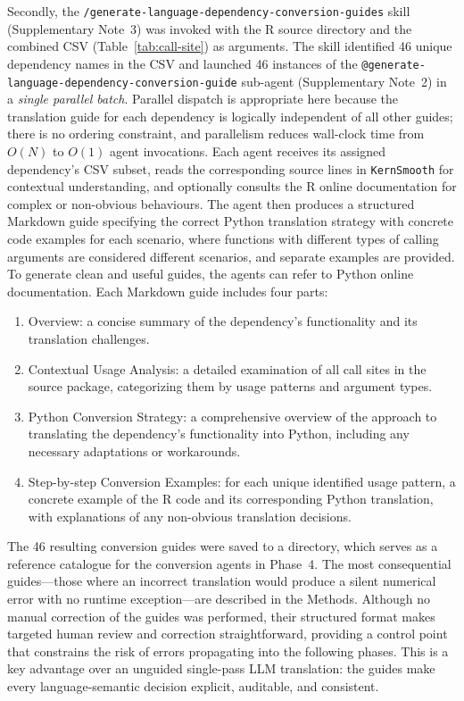 \documentclass[12pt,a4paper]{article}
\makeatletter
\newcommand{\skill}[1]{\texttt{/#1}}
\newcommand{\agent}[1]{\texttt{@#1}}
\newcommand{\pkg}[1]{\texttt{#1}}
\newcommand{\suppnote}[1]{Supplementary Note~#1}
\makeatother
\begin{document}
Secondly, the \skill{generate-language-dependency-conversion-guides} skill (\suppnote{3}) was invoked with the R source directory and the combined CSV (Table~\ref{tab:call-site}) as arguments. The skill identified 46 unique dependency names in the CSV and launched 46 instances of the \agent{generate-language-dependency-conversion-guide} sub-agent (\suppnote{2}) in a \textit{single parallel batch}. Parallel dispatch is appropriate here because the translation guide for each dependency is logically independent of all other guides; there is no ordering constraint, and parallelism reduces wall-clock time from $O(N)$ to $O(1)$ agent invocations. Each agent receives its assigned dependency's CSV subset, reads the corresponding source lines in \pkg{KernSmooth} for contextual understanding, and optionally consults the R online documentation for complex or non-obvious behaviours. The agent then produces a structured Markdown guide specifying the correct Python translation strategy with concrete code examples for each scenario, where functions with different types of calling arguments are considered different scenarios, and separate examples are provided. To generate clean and useful guides, the agents can refer to Python online documentation. Each Markdown guide includes four parts:
\begin{enumerate}
    \item Overview: a concise summary of the dependency's functionality and its translation challenges.
    \item Contextual Usage Analysis: a detailed examination of all call sites in the source package, categorizing them by usage patterns and argument types.
    \item Python Conversion Strategy: a comprehensive overview of the approach to translating the dependency's functionality into Python, including any necessary adaptations or workarounds.
    \item Step-by-step Conversion Examples: for each unique identified usage pattern, a concrete example of the R code and its corresponding Python translation, with explanations of any non-obvious translation decisions.
\end{enumerate}

The 46 resulting conversion guides were saved to a directory, which serves as a reference catalogue for the conversion agents in Phase~4. The most consequential guides---those where an incorrect translation would produce a silent numerical error with no runtime exception---are described in the Methods. Although no manual correction of the guides was performed, their structured format makes targeted human review and correction straightforward, providing a control point that constrains the risk of errors propagating into the following phases. This is a key advantage over an unguided single-pass LLM translation: the guides make every language-semantic decision explicit, auditable, and consistent.
\end{document}
